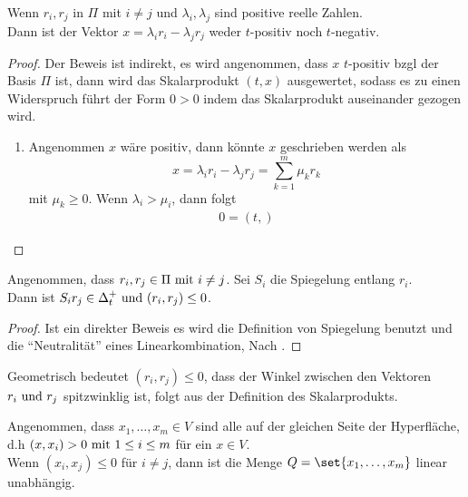 \begin{proposition}
	Wenn $r_i, r_j$ in $\Pi$ mit $i\neq j$ und $\lambda_i, \lambda_j$ sind positive reelle Zahlen.\\
	Dann ist der Vektor $x = \lambda_i r_i - \lambda_j r_j$ weder $t$-positiv noch $t$-negativ.
\end{proposition}
\begin{proof} Der Beweis ist indirekt, es wird angenommen, dass $x$ $t$-positiv bzgl der Basis $\Pi$ ist, dann wird das Skalarprodukt $(t,x)$ ausgewertet, sodass es zu einen Widerspruch führt der Form $0 > 0$ indem das Skalarprodukt auseinander gezogen wird.
	\begin{enumerate}
		\item Angenommen $x$ wäre positiv, dann könnte $x$ geschrieben werden als
		\[
			x = \lambda_i r_i - \lambda_j r_j = \sum_{k=1}^m \mu_k r_k
		\]
		mit $\mu_k \ge 0$. Wenn $\lambda_i > \mu_i$, dann folgt
		\begin{align*}
			0 = (t,)
		\end{align*}
	\end{enumerate}
\end{proof}
\begin{proposition}
	Angenommen, dass $r_i, r_j \in \Pi \mit i \neq j$. Sei $S_i$ die Spiegelung entlang $r_i$.\\
	Dann ist $S_i r_j \in \Delta_t^+ \und (r_i,r_j) \le 0$.
\end{proposition}
\begin{proof}
	Ist ein direkter Beweis es wird die Definition von Spiegelung benutzt und die ``Neutralität'' eines Linearkombination, Nach . 
\end{proof}
\begin{*remark}
	Geometrisch bedeutet $(r_i, r_j) \le 0$, dass der Winkel zwischen den Vektoren $r_i \und r_j$ spitzwinklig ist, folgt aus der Definition des Skalarprodukts.
\end{*remark}
\begin{proposition}
	Angenommen, dass $x_1, \dots, x_m \in V$ sind alle auf der gleichen Seite der Hyperfläche, d.h $(x,x_i) >0 \mit 1\le i \le m$ für ein $x \in V$.\\
	Wenn $(x_i,x_j) \le 0$ für $i\neq j$, dann ist die Menge $Q = \set{x_1,\dots,x_m}$ linear unabhängig. 
\end{proposition}
